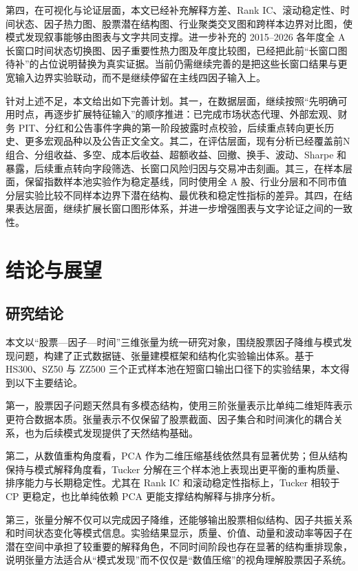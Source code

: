 第四，在可视化与论证层面，本文已经补充解释方差、Rank IC、滚动稳定性、时间状态、因子热力图、股票潜在结构图、行业聚类交叉图和跨样本边界对比图，使模式发现叙事能够由图表与文字共同支撑。进一步补充的 2015--2026 各年度全 A 长窗口时间状态切换图、因子重要性热力图及年度比较图，已经把此前“长窗口图待补”的占位说明替换为真实证据。当前仍需继续完善的是把这些长窗口结果与更宽输入边界实验联动，而不是继续停留在主线四因子输入上。

针对上述不足，本文给出如下完善计划。其一，在数据层面，继续按照“先明确可用时点，再逐步扩展特征输入”的顺序推进：已完成市场状态代理、外部宏观、财务 PIT、分红和公告事件字典的第一阶段披露时点校验，后续重点转向更长历史、更多宏观品种以及公告正文全文。其二，在评估层面，现有分析已经覆盖前N组合、分组收益、多空、成本后收益、超额收益、回撤、换手、波动、Sharpe 和暴露，后续重点转向字段筛选、长窗口风险归因与交易冲击刻画。其三，在样本层面，保留指数样本池实验作为稳定基线，同时使用全 A 股、行业分层和不同市值分层实验比较不同样本边界下潜在结构、最优秩和稳定性指标的差异。其四，在结果表达层面，继续扩展长窗口图形体系，并进一步增强图表与文字论证之间的一致性。

\chapter{结论与展望}

\section{研究结论}

本文以“股票—因子—时间”三维张量为统一研究对象，围绕股票因子降维与模式发现问题，构建了正式数据链、张量建模框架和结构化实验输出体系。基于 HS300、SZ50 与 ZZ500 三个正式样本池在短窗口输出口径下的实验结果，本文得到以下主要结论。

第一，股票因子问题天然具有多模态结构，使用三阶张量表示比单纯二维矩阵表示更符合数据本质。张量表示不仅保留了股票截面、因子集合和时间演化的耦合关系，也为后续模式发现提供了天然结构基础。

第二，从数值重构角度看，PCA 作为二维压缩基线依然具有显著优势；但从结构保持与模式解释角度看，Tucker 分解在三个样本池上表现出更平衡的重构质量、排序能力与长期稳定性。尤其在 Rank IC 和滚动稳定性指标上，Tucker 相较于 CP 更稳定，也比单纯依赖 PCA 更能支撑结构解释与排序分析。

第三，张量分解不仅可以完成因子降维，还能够输出股票相似结构、因子共振关系和时间状态变化等模式信息。实验结果显示，质量、价值、动量和波动率等因子在潜在空间中承担了较重要的解释角色，不同时间阶段也存在显著的结构重排现象，说明张量方法适合从“模式发现”而不仅仅是“数值压缩”的视角理解股票因子系统。

